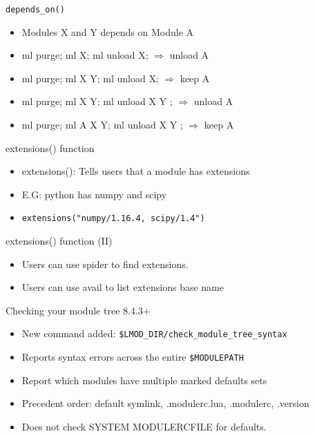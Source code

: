 \documentclass{beamer}
\begin{document}
\begin{frame}{\texttt{depends\_on()}}
  \begin{itemize}
    \item Modules X and Y depends on Module A
    \item ml purge; ml X; ml unload X;      $\Rightarrow$ unload A
    \item ml purge; ml X Y; ml unload X;    $\Rightarrow$ keep A
    \item ml purge; ml X Y; ml unload X Y ; $\Rightarrow$ unload A
    \item ml purge; ml A X Y; ml unload X Y ; $\Rightarrow$ keep A
  \end{itemize}
\end{frame}

\begin{frame}{extensions() function}
  \begin{itemize}
    \item extensions(): Tells users that a module has extensions
    \item E.G: python has numpy and scipy
    \item \texttt{extensions("numpy/1.16.4, scipy/1.4")}
  \end{itemize}
\end{frame}

\begin{frame}{extensions() function (II)}
  \begin{itemize}
    \item Users can use spider to find extensions.
    \item Users can use avail to list extensions base name
  \end{itemize}
\end{frame}

\begin{frame}{Checking your module tree 8.4.3+}
  \begin{itemize}
    \item New command added: \texttt{\$LMOD\_DIR/check\_module\_tree\_syntax}
    \item Reports syntax errors across the entire \texttt{\$MODULEPATH}
    \item Report which modules have multiple marked defaults sets
    \item Precedent order: default symlink, .modulerc.lua, .modulerc, .version
    \item Does not check SYSTEM MODULERCFILE for defaults.
  \end{itemize}
\end{frame}
\end{document}
